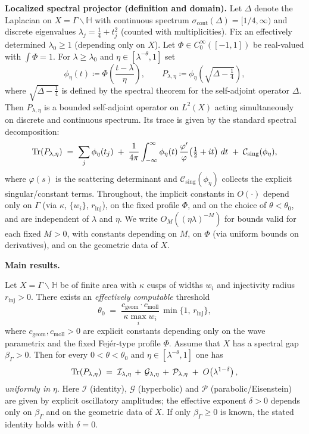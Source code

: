 \medskip
\noindent\textbf{Localized spectral projector (definition and domain).}
Let $\Delta$ denote the Laplacian on $X=\Gamma\backslash\mathbb{H}$ with
continuous spectrum $\sigma_{\mathrm{cont}}(\Delta)=[1/4,\infty)$ and discrete
eigenvalues $\lambda_j=\tfrac14+t_j^2$ (counted with multiplicities). Fix an
effectively determined $\lambda_0\ge 1$ (depending only on $X$). Let
$\Phi\in C^\infty_0([-1,1])$ be real-valued with $\int\Phi=1$. For
$\lambda\ge\lambda_0$ and $\eta\in[\lambda^{-\theta},1]$ set
\[
  \phi_\eta(t)\coloneqq \Phi\!\left(\frac{t-\lambda}{\eta}\right),\qquad
  P_{\lambda,\eta}\coloneqq \phi_\eta\!\left(\sqrt{\Delta-\tfrac14}\right),
\]
where $\sqrt{\Delta-\tfrac14}$ is defined by the spectral theorem for the
self-adjoint operator $\Delta$. Then $P_{\lambda,\eta}$ is a bounded
self-adjoint operator on $L^2(X)$ acting simultaneously on discrete and
continuous spectrum. Its trace is given by the standard spectral decomposition:
\begin{equation}\label{eq:trace-decomp}
  \operatorname{Tr}(P_{\lambda,\eta})
  \;=\; \sum_j \phi_\eta(t_j)
        \;+\; \frac{1}{4\pi}\int_{-\infty}^{\infty}
        \phi_\eta(t)\,\frac{\varphi'}{\varphi}\!\left(\tfrac12+it\right)\,dt
        \;+\; \mathcal{C}_{\mathrm{sing}}(\phi_\eta),
\end{equation}
where $\varphi(s)$ is the scattering determinant and
$\mathcal{C}_{\mathrm{sing}}(\phi_\eta)$ collects the explicit singular/constant
terms. Throughout, the implicit constants in $O(\cdot)$ depend only on $\Gamma$
(via $\kappa$, $\{w_i\}$, $r_{\mathrm{inj}}$), on the fixed profile $\Phi$, and
on the choice of $\theta<\theta_0$, and are independent of $\lambda$ and $\eta$.
We write $O_M((\eta\lambda)^{-M})$ for bounds valid for each fixed $M>0$, with
constants depending on $M$, on $\Phi$ (via uniform bounds on derivatives), and
on the geometric data of $X$.

\medskip
\noindent\textbf{Main results.}
\begin{theorem}\label{thm:localized}
Let $X=\Gamma\backslash\mathbb{H}$ be of finite area with $\kappa$ cusps of
widths $w_i$ and injectivity radius $r_{\mathrm{inj}}>0$. There exists an
\emph{effectively computable} threshold
\[
  \theta_0 \;=\;
  \frac{c_{\mathrm{geom}}\cdot c_{\mathrm{moll}}}{\kappa \max_i w_i}\,
  \min\{1,\,r_{\mathrm{inj}}\},
\]
where $c_{\mathrm{geom}},c_{\mathrm{moll}}>0$ are explicit constants depending
only on the wave parametrix and the fixed Fejér-type profile $\Phi$. Assume
that $X$ has a spectral gap $\beta_\Gamma>0$. Then for every
$0<\theta<\theta_0$ and $\eta\in[\lambda^{-\theta},1]$ one has
\[
  \operatorname{Tr}(P_{\lambda,\eta})
  \;=\; \mathcal{I}_{\lambda,\eta} \,+\, \mathcal{G}_{\lambda,\eta}
        \,+\, \mathcal{P}_{\lambda,\eta}
        \;+\; O\!\left(\lambda^{1-\delta}\right),
\]
\emph{uniformly in $\eta$}. Here $\mathcal{I}$ (identity), $\mathcal{G}$
(hyperbolic) and $\mathcal{P}$ (parabolic/Eisenstein) are given by explicit
oscillatory amplitudes; the effective exponent $\delta>0$ depends only on
$\beta_\Gamma$ and on the geometric data of $X$. If only $\beta_\Gamma\ge 0$ is
known, the stated identity holds with $\delta=0$.
\end{theorem}

